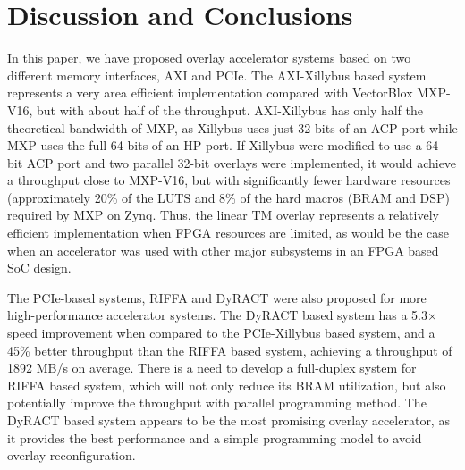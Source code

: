 \section{Discussion and Conclusions}
In this paper, we have proposed overlay accelerator systems based on two different memory interfaces, AXI and PCIe. 
The AXI-Xillybus based system represents a very area efficient implementation compared with VectorBlox MXP-V16, but with about half of the throughput. 
AXI-Xillybus has only half the theoretical bandwidth of MXP, as Xillybus uses just 32-bits of an ACP port while MXP uses the full 64-bits of an HP port. 
If Xillybus were modified to use a 64-bit ACP port and two parallel 32-bit overlays were implemented, it would achieve a throughput close to MXP-V16, but with significantly fewer hardware resources (approximately 20\% of the LUTS and 8\% of the hard macros (BRAM and DSP) required by MXP on Zynq.
Thus, the linear TM overlay represents a relatively efficient implementation when FPGA resources are limited, as would be the case when an accelerator was used with other major subsystems in an FPGA based SoC design.

The PCIe-based systems, RIFFA and DyRACT were also proposed for more high-performance accelerator systems.
The DyRACT based system has a 5.3$\times$ speed improvement when compared to the PCIe-Xillybus based system, and a 45\% better throughput than the RIFFA based system, achieving a throughput of 1892 MB/s on average.
There is a need to develop a full-duplex system for RIFFA based system, which will not only reduce its BRAM utilization, but also potentially improve the throughput with parallel programming method. 
The DyRACT based system appears to be the most promising overlay accelerator, as it provides the best performance and a simple programming model to avoid overlay reconfiguration. 
